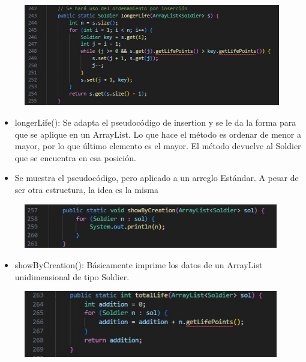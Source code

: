 \documentclass{article}
\begin{document}
	\begin{figure}[H]
		\centering
		\includegraphics[width=1\textwidth,keepaspectratio]{img/longerLife.jpg}
	\end{figure}
	
	
	\begin{itemize}	
		\item longerLife(): Se adapta el pseudocódigo de insertion y se le da la forma para que se aplique en un ArrayList. Lo que hace el método es ordenar de menor a mayor, por lo que último elemento es el mayor. El método devuelve al Soldier que se encuentra en esa posición.
		\item Se muestra el pseudocódigo, pero aplicado a un arreglo Estándar. A pesar de ser otra estructura, la idea es la misma
	\end{itemize}
	
	
	\begin{figure}[H]
		\centering
		\includegraphics[width=0.99\textwidth,keepaspectratio]{img/showByCreation.jpg}
	\end{figure}
	
	\begin{itemize}	
		\item showByCreation(): Básicamente imprime los datos de un ArrayList unidimensional de tipo Soldier.
	\end{itemize}
	
	\begin{figure}[H]
		\centering
		\includegraphics[width=0.99\textwidth,keepaspectratio]{img/totalLife.jpg}
	\end{figure}	
	
\end{document}
